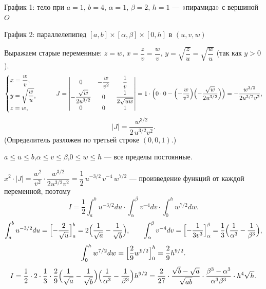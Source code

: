 \begin{center}
\begin{minipage}[t]{0.49\linewidth}\centering
\figEight

\small График 1: тело при $a=1$, $b=4$, $\alpha=1$, $\beta=2$, $h=1$ --- «пирамида» с вершиной $O$
\end{minipage}\hfill
\begin{minipage}[t]{0.49\linewidth}\centering
{}

\small График 2: параллелепипед $[a,b]\times[\alpha,\beta]\times[0,h]$ в $(u,v,w)$
\end{minipage}
\end{center}

Выражаем старые переменные: $z=w$, $x=\dfrac zv=\dfrac wv$, $y=\sqrt{\dfrac zu}=\sqrt{\dfrac wu}$ (так как $y>0$).
\[
\begin{cases}x=\dfrac wv,\\[2mm] y=\sqrt{\dfrac wu},\\[2mm] z=w,\end{cases}
\qquad
J=\begin{vmatrix}0&-\dfrac{w}{v^2}&\dfrac1v\\[2mm] -\dfrac{\sqrt w}{2u^{3/2}}&0&\dfrac{1}{2\sqrt{uw}}\\[2mm] 0&0&1\end{vmatrix}
=1\cdot\Bigl(0\cdot0-\Bigl(-\frac{w}{v^2}\Bigr)\Bigl(-\frac{\sqrt w}{2u^{3/2}}\Bigr)\Bigr)=-\frac{w^{3/2}}{2u^{3/2}v^2},
\]
\[
|J|=\frac{w^{3/2}}{2\,u^{3/2}v^2}.
\]
(Определитель разложен по третьей строке $(0,0,1)$.)

$a\leqslant u\leqslant b$,\quad $\alpha\leqslant v\leqslant\beta$,\quad $0\leqslant w\leqslant h$ --- все пределы постоянные.

$x^2\cdot|J|=\dfrac{w^2}{v^2}\cdot\dfrac{w^{3/2}}{2u^{3/2}v^2}=\dfrac12\,u^{-3/2}\,v^{-4}\,w^{7/2}$ --- произведение функций от каждой переменной, поэтому
\[
I=\frac12\int_a^b u^{-3/2}du\cdot\int_\alpha^\beta v^{-4}dv\cdot\int_0^h w^{7/2}dw .
\]
\[
\int_a^bu^{-3/2}du=\Bigl[-\frac{2}{\sqrt u}\Bigr]_a^b=2\Bigl(\frac1{\sqrt a}-\frac1{\sqrt b}\Bigr),\qquad
\int_\alpha^\beta v^{-4}dv=\Bigl[-\frac1{3v^3}\Bigr]_\alpha^\beta=\frac13\Bigl(\frac1{\alpha^3}-\frac1{\beta^3}\Bigr),
\]
\[
\int_0^hw^{7/2}dw=\Bigl[\frac{2}{9}w^{9/2}\Bigr]_0^h=\frac29h^{9/2}.
\]
\[
I=\frac12\cdot2\cdot\frac13\cdot\frac29\Bigl(\frac1{\sqrt a}-\frac1{\sqrt b}\Bigr)\Bigl(\frac1{\alpha^3}-\frac1{\beta^3}\Bigr)h^{9/2}
=\frac{2}{27}\cdot\frac{\sqrt b-\sqrt a}{\sqrt{ab}}\cdot\frac{\beta^3-\alpha^3}{\alpha^3\beta^3}\cdot h^4\sqrt h .
\]

